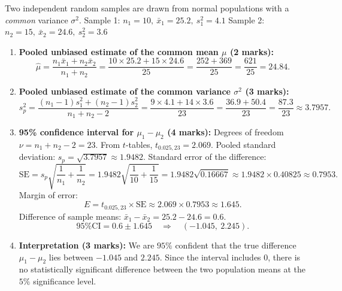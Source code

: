 \documentclass[11pt]{article}
\begin{document}
\begin{corrige}
Two independent random samples are drawn from normal populations with a \emph{common} variance \(\sigma^2\).
Sample 1: \(n_1=10,\ \bar{x}_1=25.2,\ s_1^2=4.1\)
Sample 2: \(n_2=15,\ \bar{x}_2=24.6,\ s_2^2=3.6\)

\begin{enumerate}
\item \textbf{Pooled unbiased estimate of the common mean \(\mu\) (2 marks):}
\[
\hat{\mu} = \frac{n_1\bar{x}_1 + n_2\bar{x}_2}{n_1+n_2}
= \frac{10\times25.2 + 15\times24.6}{25}
= \frac{252 + 369}{25}
= \frac{621}{25} = 24.84.
\]

\item \textbf{Pooled unbiased estimate of the common variance \(\sigma^2\) (3 marks):}
\[
s_p^2 = \frac{(n_1-1)s_1^2 + (n_2-1)s_2^2}{n_1+n_2-2}
= \frac{9\times4.1 + 14\times3.6}{23}
= \frac{36.9 + 50.4}{23}
= \frac{87.3}{23} \approx 3.7957.
\]

\item \textbf{95\% confidence interval for \(\mu_1-\mu_2\) (4 marks):}
Degrees of freedom \(\nu = n_1+n_2-2 = 23\). From \(t\)-tables, \(t_{0.025,23} = 2.069\).
Pooled standard deviation: \(s_p = \sqrt{3.7957} \approx 1.9482\).
Standard error of the difference:
\[
\text{SE} = s_p\sqrt{\frac{1}{n_1}+\frac{1}{n_2}}
= 1.9482\sqrt{\frac{1}{10}+\frac{1}{15}}
= 1.9482\sqrt{0.16667} \approx 1.9482 \times 0.40825 \approx 0.7953.
\]
Margin of error:
\[
E = t_{0.025,23} \times \text{SE} \approx 2.069 \times 0.7953 \approx 1.645.
\]
Difference of sample means: \(\bar{x}_1-\bar{x}_2 = 25.2 - 24.6 = 0.6\).
\[
\text{95\% CI} = 0.6 \pm 1.645 \quad\Rightarrow\quad (-1.045,\ 2.245).
\]

\item \textbf{Interpretation (3 marks):}
We are \(95\%\) confident that the true difference \(\mu_1-\mu_2\) lies between \(-1.045\) and \(2.245\). Since the interval includes \(0\), there is no statistically significant difference between the two population means at the \(5\%\) significance level.
\end{enumerate}
\end{corrige}
\end{document}
